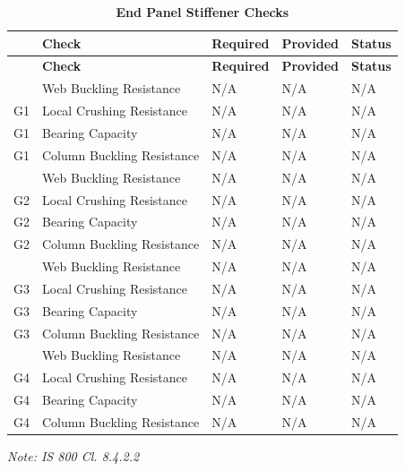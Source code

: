 \documentclass[12pt,a4paper]{report}
\numberwithin{table}{chapter}
\numberwithin{figure}{chapter}
\newcommand{\ReportTableGap}{\vspace{1em}}
\begin{document}
\ReportTableGap

\begin{longtable}{|C{2.5cm}|L{3.5cm}|C{3.5cm}|>{\centering\arraybackslash}p{4.2cm}|C{1.8cm}|}
\caption{\textbf{End Panel Stiffener Checks}}\\
\hline
\textbf{} & \textbf{Check} & \textbf{Required} & \textbf{Provided} & \textbf{Status} \\[6pt]
\hline
\endfirsthead
\hline
\textbf{} & \textbf{Check} & \textbf{Required} & \textbf{Provided} & \textbf{Status} \\[6pt]
\hline
\endhead

 & Web Buckling Resistance & N/A & N/A & N/A \\[6pt]
G1 & Local Crushing Resistance & N/A & N/A & N/A \\[6pt]
G1 & Bearing Capacity & N/A & N/A & N/A \\[6pt]
G1 & Column Buckling Resistance & N/A & N/A & N/A \\[6pt]
\hline
{} & Web Buckling Resistance & N/A & N/A & N/A \\[6pt]
G2 & Local Crushing Resistance & N/A & N/A & N/A \\[6pt]
G2 & Bearing Capacity & N/A & N/A & N/A \\[6pt]
G2 & Column Buckling Resistance & N/A & N/A & N/A \\[6pt]
\hline
{} & Web Buckling Resistance & N/A & N/A & N/A \\[6pt]
G3 & Local Crushing Resistance & N/A & N/A & N/A \\[6pt]
G3 & Bearing Capacity & N/A & N/A & N/A \\[6pt]
G3 & Column Buckling Resistance & N/A & N/A & N/A \\[6pt]
\hline
{} & Web Buckling Resistance & N/A & N/A & N/A \\[6pt]
G4 & Local Crushing Resistance & N/A & N/A & N/A \\[6pt]
G4 & Bearing Capacity & N/A & N/A & N/A \\[6pt]
G4 & Column Buckling Resistance & N/A & N/A & N/A \\[6pt]
\hline
\end{longtable}
\noindent\textit{Note: IS 800 Cl. 8.4.2.2}
\end{document}

